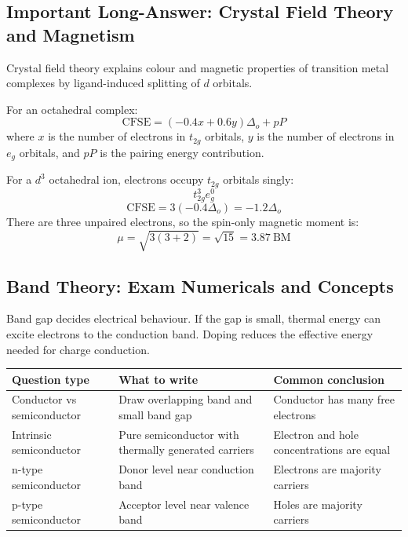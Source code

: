 \documentclass[12pt,a4paper]{article}
\begin{document}
\subsection{Important Long-Answer: Crystal Field Theory and Magnetism}
Crystal field theory explains colour and magnetic properties of transition metal complexes by ligand-induced splitting of $d$ orbitals.

\begin{tcolorbox}[formulabox, title={Crystal Field Stabilization Energy}]
For an octahedral complex:
\[
\mathrm{CFSE}=(-0.4x+0.6y)\Delta_o+pP
\]
where $x$ is the number of electrons in $t_{2g}$ orbitals, $y$ is the number of electrons in $e_g$ orbitals, and $pP$ is the pairing energy contribution.
\end{tcolorbox}

\begin{tcolorbox}[examplebox, title={Solved Example: Octahedral \texorpdfstring{$d^3$}{d3} Configuration}]
For a $d^3$ octahedral ion, electrons occupy $t_{2g}$ orbitals singly:
\[
t_{2g}^3e_g^0
\]
\[
\mathrm{CFSE}=3(-0.4\Delta_o)=-1.2\Delta_o
\]
There are three unpaired electrons, so the spin-only magnetic moment is:
\[
\mu=\sqrt{3(3+2)}=\sqrt{15}=3.87\ \mathrm{BM}
\]
\end{tcolorbox}

\subsection{Band Theory: Exam Numericals and Concepts}
Band gap decides electrical behaviour. If the gap is small, thermal energy can excite electrons to the conduction band. Doping reduces the effective energy needed for charge conduction.

\begin{tabularx}{\linewidth}{|B{3.2cm}|Y|Y|}
\hline
\textbf{Question type} & \textbf{What to write} & \textbf{Common conclusion} \\
\hline
Conductor vs semiconductor & Draw overlapping band and small band gap & Conductor has many free electrons \\
\hline
Intrinsic semiconductor & Pure semiconductor with thermally generated carriers & Electron and hole concentrations are equal \\
\hline
n-type semiconductor & Donor level near conduction band & Electrons are majority carriers \\
\hline
p-type semiconductor & Acceptor level near valence band & Holes are majority carriers \\
\hline
\end{tabularx}
\end{document}
